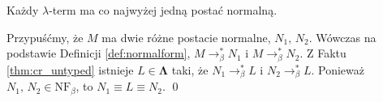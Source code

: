 \begin{wniosek}\label{thm:ch_wniosek2_untyped}
  \item Każdy \(\lambda\)-term ma co najwyżej jedną postać normalną.
\end{wniosek}
\begin{dowod}
\item Przypuśćmy, że \(M\) ma dwie różne postacie normalne, \(N_1,\, N_2\). Wówczas na podstawie Definicji \ref{def:normalform}, \(M\to^{*}_\beta N_1\) i \(M\to^{*}_\beta N_2\). Z Faktu \ref{thm:cr_untyped} istnieje \(L\in\mathbf{\Lambda}\) taki, że \(N_1 \to^{*}_\beta L\) i \(N_2 \to^{*}_\beta L\). Ponieważ \(N_1,\,N_2\in \mathrm{NF}_\beta\), to \(N_1\equiv L \equiv N_2\).
  \qed
\end{dowod}
